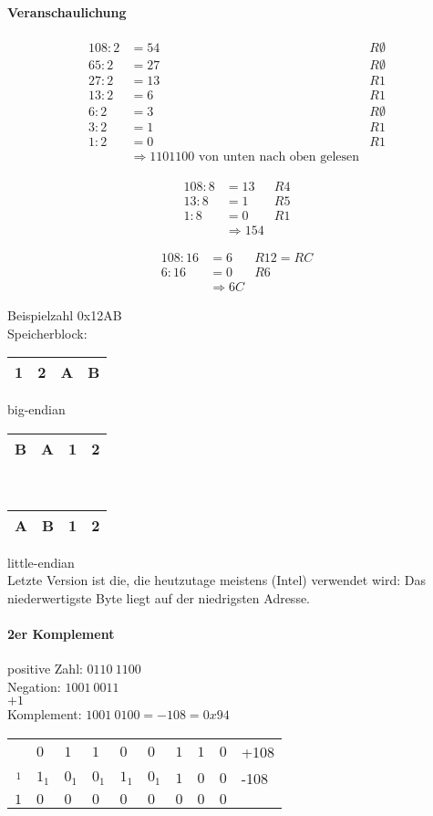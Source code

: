 \documentclass{scrreprt}
\begin{document}
\paragraph{Veranschaulichung}
\begin{align*}
108:2&=54 &R \emptyset\\
65:2 &= 27 &R \emptyset\\
27:2&= 13 &R 1\\
13:2 &= 6 &R 1\\
6:2 &=3 &R \emptyset\\
3:2 &= 1 &R 1\\
1:2&= 0 &R 1\\
&\Rightarrow 1101100 \text{ von unten nach oben gelesen}&
\end{align*}

\begin{align*}
108:8 &= 13 &R4\\
13:8 &= 1 &R5\\
1:8 &= 0 &R1\\
&\Rightarrow 154&
\end{align*}

\begin{align*}
108: 16 &= 6 &R12 = RC\\
6:16 &= 0 &R6\\
&\Rightarrow 6C&
\end{align*}

Beispielzahl 0x12AB\medskip\\
Speicherblock:\\
\begin{tabular}{|l|l|l|l|}
\hline
1&2&A&B\\
\hline
\end{tabular} big-endian\\
\begin{tabular}{|l|l|l|l|}
\hline
B&A&1&2\\
\hline
\end{tabular}\\
\begin{tabular}{|l|l|l|l|}
\hline
A&B&1&2\\
\hline
\end{tabular} little-endian\\
Letzte Version ist die, die heutzutage meistens (Intel) verwendet wird: Das niederwertigste Byte liegt auf der niedrigsten Adresse.

\paragraph{2er Komplement}
positive Zahl: $\boxed{0}110 \: 1100$\\
Negation: $1001\: 0011$\\
$+1$\\
Komplement: $1001 \: 0100 = -108 = 0x94$\\
\begin{tabular}{r | l l l l l l l l l}
 & $0$&$1$&$1$&$0$&$0$&$1$&$1$&$0$ & +108\\
$_1$&$1_1$&$0_1$&$0_1$&$1_1$&$0_1$&$1$&$0$&$0$ & -108\\
\hline
$1$&$0$&$0$&$0$&$0$&$0$&$0$&$0$&$0$&\\

\end{tabular}
\end{document}
